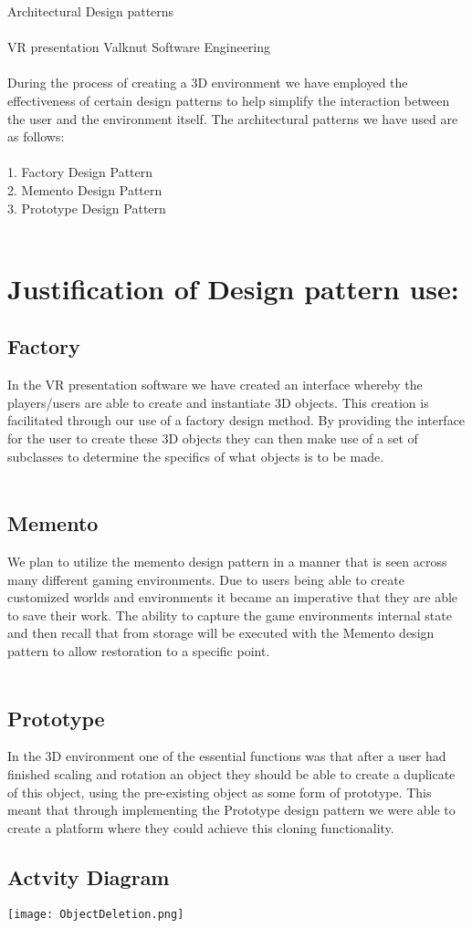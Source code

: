 {\Large Architectural Design patterns} \\\\
 VR presentation Valknut Software Engineering \\\\
During the process of creating a 3D environment we have employed the effectiveness of certain design patterns to help simplify the interaction between the user and the environment itself. The architectural patterns we have used are as follows:\\\\
1.	Factory Design Pattern\\
2.	Memento Design Pattern\\
3.	Prototype Design Pattern\\\\
	\section{Justification of Design pattern use:}
	\subsection{Factory}
	In the VR presentation software we have created an interface whereby the players/users are able to create and instantiate 3D objects. This creation is facilitated through our use of a factory design method. By providing the interface for the user to create these 3D objects they can then make use of a set of subclasses to determine the specifics of what objects is to be made.\\\\
	\subsection{Memento}
	We plan to utilize the memento design pattern in a manner that is seen across many different gaming environments. Due to users being able to create customized worlds and environments it became an imperative that they are able to save their work. The ability to capture the game environments internal state and then recall that from storage will be executed with the Memento design pattern to allow restoration to a specific point.\\\\
	\subsection{Prototype}
	In the 3D environment one of the essential functions was that after a user had finished scaling and rotation an object they should be able to create a duplicate of this object, using the pre-existing object as some form of prototype. This meant that through implementing the Prototype design pattern we were able to create a platform where they could achieve this cloning functionality.
  	\subsection{Actvity Diagram}
	\texttt{[image: ObjectDeletion.png]}
